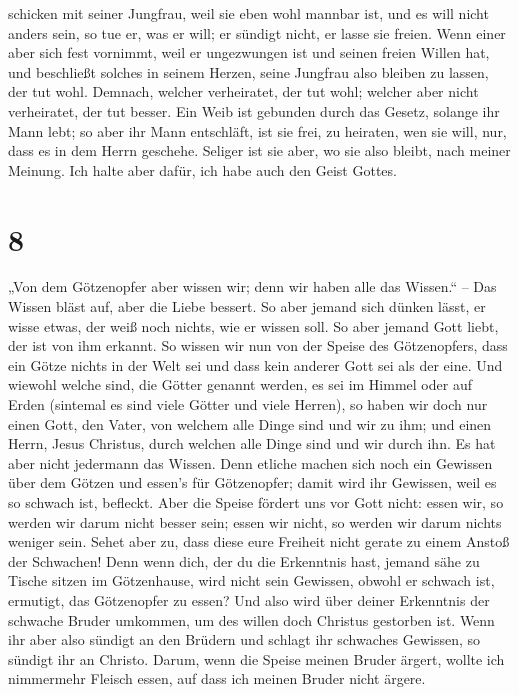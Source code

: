 schicken mit seiner Jungfrau, weil sie eben wohl mannbar ist, und es
will nicht anders sein, so tue er, was er will; er sündigt nicht, er
lasse sie freien.  Wenn einer aber sich fest vornimmt,
weil er ungezwungen ist und seinen freien Willen hat, und beschließt
solches in seinem Herzen, seine Jungfrau also bleiben zu lassen, der tut
wohl.  Demnach, welcher verheiratet, der tut wohl;
welcher aber nicht verheiratet, der tut besser.  Ein Weib
ist gebunden durch das Gesetz, solange ihr Mann lebt; so aber ihr Mann
entschläft, ist sie frei, zu heiraten, wen sie will, nur, dass es in dem
Herrn geschehe.  Seliger ist sie aber, wo sie also
bleibt, nach meiner Meinung. Ich halte aber dafür, ich habe auch den
Geist Gottes.

\hypertarget{section-7}{%
\section{8}\label{section-7}}

 „Von dem Götzenopfer aber wissen wir; denn wir haben alle
das Wissen.`` -- Das Wissen bläst auf, aber die Liebe bessert.
 So aber jemand sich dünken lässt, er wisse etwas, der
weiß noch nichts, wie er wissen soll.  So aber jemand Gott
liebt, der ist von ihm erkannt.  So wissen wir nun von der
Speise des Götzenopfers, dass ein Götze nichts in der Welt sei und dass
kein anderer Gott sei als der eine.  Und wiewohl welche
sind, die Götter genannt werden, es sei im Himmel oder auf Erden
(sintemal es sind viele Götter und viele Herren),  so
haben wir doch nur einen Gott, den Vater, von welchem alle Dinge sind
und wir zu ihm; und einen Herrn, Jesus Christus, durch welchen alle
Dinge sind und wir durch ihn.  Es hat aber nicht jedermann
das Wissen. Denn etliche machen sich noch ein Gewissen über dem Götzen
und essen's für Götzenopfer; damit wird ihr Gewissen, weil es so schwach
ist, befleckt.  Aber die Speise fördert uns vor Gott
nicht: essen wir, so werden wir darum nicht besser sein; essen wir
nicht, so werden wir darum nichts weniger sein.  Sehet
aber zu, dass diese eure Freiheit nicht gerate zu einem Anstoß der
Schwachen!  Denn wenn dich, der du die Erkenntnis hast,
jemand sähe zu Tische sitzen im Götzenhause, wird nicht sein Gewissen,
obwohl er schwach ist, ermutigt, das Götzenopfer zu essen?
 Und also wird über deiner Erkenntnis der schwache Bruder
umkommen, um des willen doch Christus gestorben ist. 
Wenn ihr aber also sündigt an den Brüdern und schlagt ihr schwaches
Gewissen, so sündigt ihr an Christo.  Darum, wenn die
Speise meinen Bruder ärgert, wollte ich nimmermehr Fleisch essen, auf
dass ich meinen Bruder nicht ärgere.


